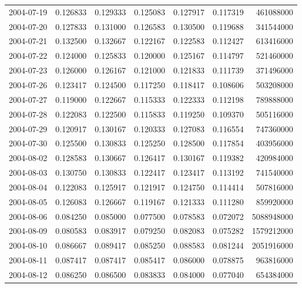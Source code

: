 \begin{tabular}{lrrrrrr}
2004-07-19 &    0.126833 &    0.129333 &    0.125083 &    0.127917 &    0.117319 &   461088000 \\
2004-07-20 &    0.127833 &    0.131000 &    0.126583 &    0.130500 &    0.119688 &   341544000 \\
2004-07-21 &    0.132500 &    0.132667 &    0.122167 &    0.122583 &    0.112427 &   613416000 \\
2004-07-22 &    0.124000 &    0.125833 &    0.120000 &    0.125167 &    0.114797 &   521460000 \\
2004-07-23 &    0.126000 &    0.126167 &    0.121000 &    0.121833 &    0.111739 &   371496000 \\
2004-07-26 &    0.123417 &    0.124500 &    0.117250 &    0.118417 &    0.108606 &   503208000 \\
2004-07-27 &    0.119000 &    0.122667 &    0.115333 &    0.122333 &    0.112198 &   789888000 \\
2004-07-28 &    0.122083 &    0.122500 &    0.115833 &    0.119250 &    0.109370 &   505116000 \\
2004-07-29 &    0.120917 &    0.130167 &    0.120333 &    0.127083 &    0.116554 &   747360000 \\
2004-07-30 &    0.125500 &    0.130833 &    0.125250 &    0.128500 &    0.117854 &   403956000 \\
2004-08-02 &    0.128583 &    0.130667 &    0.126417 &    0.130167 &    0.119382 &   420984000 \\
2004-08-03 &    0.130750 &    0.130833 &    0.122417 &    0.123417 &    0.113192 &   741540000 \\
2004-08-04 &    0.122083 &    0.125917 &    0.121917 &    0.124750 &    0.114414 &   507816000 \\
2004-08-05 &    0.126083 &    0.126667 &    0.119167 &    0.121333 &    0.111280 &   859920000 \\
2004-08-06 &    0.084250 &    0.085000 &    0.077500 &    0.078583 &    0.072072 &  5088948000 \\
2004-08-09 &    0.080583 &    0.083917 &    0.079250 &    0.082083 &    0.075282 &  1579212000 \\
2004-08-10 &    0.086667 &    0.089417 &    0.085250 &    0.088583 &    0.081244 &  2051916000 \\
2004-08-11 &    0.087417 &    0.087417 &    0.085417 &    0.086000 &    0.078875 &   963816000 \\
2004-08-12 &    0.086250 &    0.086500 &    0.083833 &    0.084000 &    0.077040 &   654384000 \\

\end{tabular}
